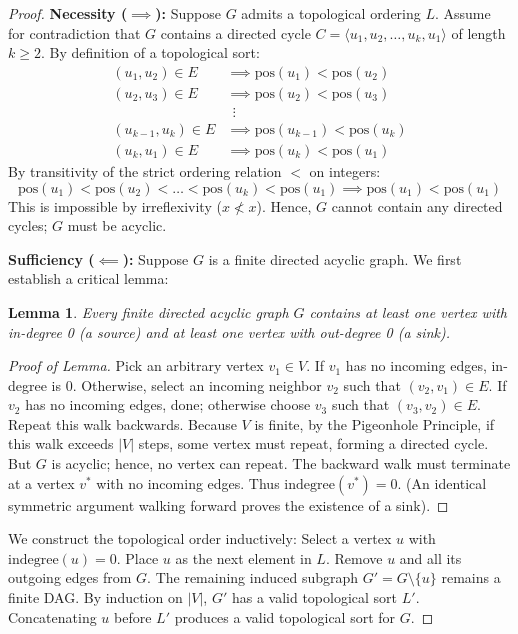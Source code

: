 \documentclass[10pt,journal,compsoc,onecolumn]{IEEEtran}
\newtheorem{lemma}[theorem]{Lemma}
\begin{document}
\begin{proof}
\textbf{Necessity ($\implies$):} Suppose $G$ admits a topological ordering $L$. Assume for contradiction that $G$ contains a directed cycle $C = \langle u_1, u_2, \dots, u_k, u_1 \rangle$ of length $k \ge 2$.
By definition of a topological sort:
\begin{align}
(u_1, u_2) \in E &\implies \text{pos}(u_1) < \text{pos}(u_2) \\
(u_2, u_3) \in E &\implies \text{pos}(u_2) < \text{pos}(u_3) \\
&\ \ \vdots \nonumber \\
(u_{k-1}, u_k) \in E &\implies \text{pos}(u_{k-1}) < \text{pos}(u_k) \\
(u_k, u_1) \in E &\implies \text{pos}(u_k) < \text{pos}(u_1)
\end{align}
By transitivity of the strict ordering relation $<$ on integers:
\begin{equation}
\text{pos}(u_1) < \text{pos}(u_2) < \dots < \text{pos}(u_k) < \text{pos}(u_1) \implies \text{pos}(u_1) < \text{pos}(u_1)
\end{equation}
This is impossible by irreflexivity ($x \not< x$). Hence, $G$ cannot contain any directed cycles; $G$ must be acyclic.

\textbf{Sufficiency ($\impliedby$):} Suppose $G$ is a finite directed acyclic graph. We first establish a critical lemma:
\begin{lemma}
Every finite directed acyclic graph $G$ contains at least one vertex with in-degree 0 (a source) and at least one vertex with out-degree 0 (a sink).
\end{lemma}
\begin{proof}[Proof of Lemma]
Pick an arbitrary vertex $v_1 \in V$. If $v_1$ has no incoming edges, in-degree is 0. Otherwise, select an incoming neighbor $v_2$ such that $(v_2, v_1) \in E$. If $v_2$ has no incoming edges, done; otherwise choose $v_3$ such that $(v_3, v_2) \in E$. Repeat this walk backwards. Because $V$ is finite, by the Pigeonhole Principle, if this walk exceeds $|V|$ steps, some vertex must repeat, forming a directed cycle. But $G$ is acyclic; hence, no vertex can repeat. The backward walk must terminate at a vertex $v^*$ with no incoming edges. Thus $\text{indegree}(v^*) = 0$. (An identical symmetric argument walking forward proves the existence of a sink).
\end{proof}

We construct the topological order inductively:
Select a vertex $u$ with $\text{indegree}(u) = 0$. Place $u$ as the next element in $L$. Remove $u$ and all its outgoing edges from $G$. The remaining induced subgraph $G' = G \setminus \{u\}$ remains a finite DAG. By induction on $|V|$, $G'$ has a valid topological sort $L'$. Concatenating $u$ before $L'$ produces a valid topological sort for $G$.
\end{proof}
\end{document}
